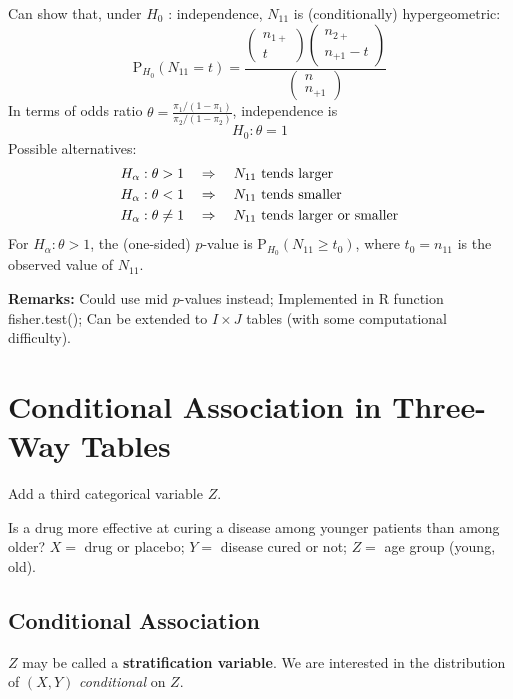 \documentclass[11pt]{elegantbook}
\begin{document}
Can show that, under $H_0$ : independence, $N_{11}$ is (conditionally) hypergeometric:
$$
\mathrm{P}_{H_0}\left(N_{11}=t\right)=\frac{\begin{pmatrix}
    n_{1+} \\
    t
\end{pmatrix}\begin{pmatrix}
    n_{2+}\\
    n_{+1}-t
\end{pmatrix}}{\begin{pmatrix}
    n \\
    n_{+1}
\end{pmatrix}}
$$
In terms of odds ratio $\theta=\frac{\pi_1/(1-\pi_1)}{\pi_2/(1-\pi_2)}$, independence is $$H_0:\theta=1$$
Possible alternatives:
\begin{equation}
    \begin{aligned}
        H_\alpha:\theta>1 \quad &\Rightarrow\quad N_{11} \textnormal{ tends larger}\\
        H_\alpha:\theta<1 \quad &\Rightarrow\quad N_{11} \textnormal{ tends smaller}\\
        H_\alpha:\theta\neq 1 \quad &\Rightarrow\quad N_{11} \textnormal{ tends larger or smaller}
    \end{aligned}
    \nonumber
\end{equation}
For $H_\alpha:\theta>1$, the (one-sided) $p$-value is $\mathrm{P}_{H_0}\left(N_{11}\geq t_0\right)$, where $t_0=n_{11}$ is the observed value of $N_{11}$.

\textbf{Remarks:} Could use mid $p$-values instead; Implemented in R function fisher.test(); Can be extended to $I \times J$ tables (with some computational difficulty).


\section{Conditional Association in Three-Way Tables}
Add a third categorical variable $Z$.
\begin{example}
    Is a drug more effective at curing a disease among younger patients than among older?
    $X=$ drug or placebo; $Y=$ disease cured or not; $Z=$ age group (young, old).
\end{example}
\subsection{Conditional Association}
$Z$ may be called a \textbf{stratification variable}. We are interested in the distribution of $(X, Y)$ \textit{conditional} on $Z$.
\end{document}
